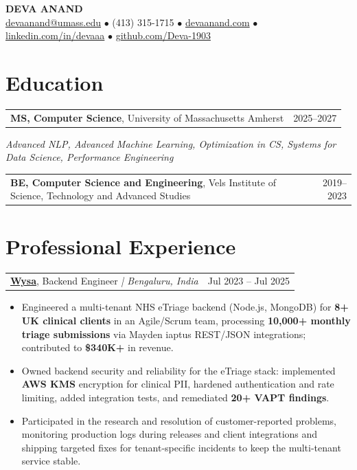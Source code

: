 \documentclass[letterpaper,11pt]{article}
\makeatletter
\newcommand{\eduItem}[3]{%
  \begin{tabular*}{\textwidth}{@{}l@{\extracolsep{\fill}}r@{}}
    \textbf{#1}, #2 & #3 \\
  \end{tabular*}\par
}
\newcommand{\expItem}[4]{%
  \vspace{2pt}
  \begin{tabular*}{\textwidth}{@{}l@{\extracolsep{\fill}}r@{}}
    \textbf{#1}, #2 \textit{| #3} & #4 \\
  \end{tabular*}\par\vspace{-3pt}
}
\makeatother
\begin{document}
\begin{center}
    {\fontsize{18}{20}\selectfont\bfseries DEVA ANAND}\\ \vspace{3pt}
    {\small
    \href{mailto:devaanand@umass.edu}{devaanand@umass.edu}
    \enspace$\bullet$\enspace
    (413) 315-1715
    \enspace$\bullet$\enspace
    \href{https://devaanand.com}{devaanand.com}
    \enspace$\bullet$\enspace
    \href{https://linkedin.com/in/devaaa/}{linkedin.com/in/devaaa}
    \enspace$\bullet$\enspace
    \href{https://github.com/Deva-1903}{github.com/Deva-1903}}
\end{center}
\vspace{-8pt}

\section{Education}
\eduItem{MS, Computer Science}{University of Massachusetts Amherst}{2025--2027}
{\small\textit{Advanced NLP, Advanced Machine Learning, Optimization in CS, Systems for Data Science, Performance Engineering}}\par
\vspace{3pt}
\eduItem{BE, Computer Science and Engineering}{Vels Institute of Science, Technology and Advanced Studies}{2019--2023}

\section{Professional Experience}

\expItem{\href{https://www.wysa.io}{Wysa}}{Backend Engineer}{Bengaluru, India}{Jul 2023 -- Jul 2025}
\begin{itemize}
  \item Engineered a multi-tenant NHS eTriage backend (Node.js, MongoDB) for \textbf{8+ UK clinical clients} in an Agile/Scrum team, processing \textbf{10{,}000+ monthly triage submissions} via Mayden iaptus REST/JSON integrations; contributed to \textbf{\$340K+} in revenue.
  \item Owned backend security and reliability for the eTriage stack: implemented \textbf{AWS KMS} encryption for clinical PII, hardened authentication and rate limiting, added integration tests, and remediated \textbf{20+ VAPT findings}.
  \item Participated in the research and resolution of customer-reported problems, monitoring production logs during releases and client integrations and shipping targeted fixes for tenant-specific incidents to keep the multi-tenant service stable.
\end{itemize}
\end{document}
